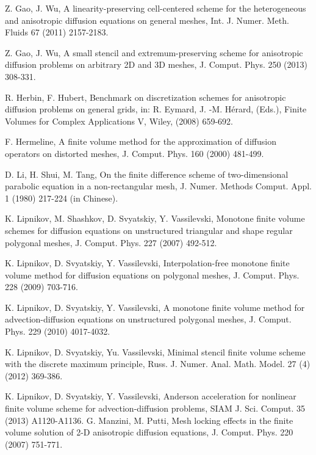 \documentclass[times,review,preprint,authoryear]{elsarticle}
\begin{document}
\begin{thebibliography}{100}
Z. Gao, J. Wu, A linearity-preserving cell-centered scheme for the heterogeneous
and anisotropic diffusion equations on general meshes, Int. J. Numer. Meth. Fluids 67 (2011) 2157-2183.


Z. Gao, J. Wu, A small stencil and extremum-preserving scheme for anisotropic diffusion problems on arbitrary 2D and 3D meshes, J. Comput. Phys. 250 (2013) 308-331.



R. Herbin,   F. Hubert, Benchmark on discretization schemes for anisotropic diffusion problems on
general grids,  {\color{black}in: R. Eymard, J. -M. H\'erard}, (Eds.),
Finite Volumes for Complex Applications V, {\color{black} Wiley, (2008) 659-692}.

F. Hermeline, A finite volume method for the approximation of diffusion operators on distorted meshes, J. Comput. Phys. 160 (2000) 481-499.



D. Li, H. Shui, M. Tang, On the finite difference scheme of two-dimensional parabolic equation in a non-rectangular mesh, J. Numer. Methods
Comput. Appl. 1 (1980) 217-224 (in Chinese).

 K. Lipnikov, M. Shashkov, D. Svyatskiy, Y. Vassilevski, Monotone finite volume schemes for diffusion equations on unstructured triangular and shape regular polygonal meshes, J. Comput. Phys. 227 (2007) 492-512.










K. Lipnikov, D. Svyatskiy, Y. Vassilevski, Interpolation-free monotone finite volume method for diffusion equations on polygonal meshes, J. Comput.
Phys. 228 (2009)  703-716.

K. Lipnikov, D. Svyatskiy, Y. Vassilevski, A monotone finite volume method for advection-diffusion equations on unstructured polygonal meshes, J. Comput. Phys. 229 (2010) 4017-4032.

K. Lipnikov, D. Svyatskiy, Yu. Vassilevski, Minimal stencil finite volume scheme with the discrete maximum principle, Russ. J. Numer. Anal. Math. Model. 27 (4) (2012) 369-386.

K. Lipnikov, D. Svyatskiy, Y. Vassilevski, Anderson acceleration for nonlinear finite volume scheme for advection-diffusion problems, SIAM J. Sci. Comput. 35 (2013) A1120-A1136.
%
 G. Manzini, M. Putti, Mesh locking effects in the finite volume solution of 2-D anisotropic diffusion equations, J. Comput. Phys. 220 (2007) 751-771.



\end{thebibliography}
\end{document}
